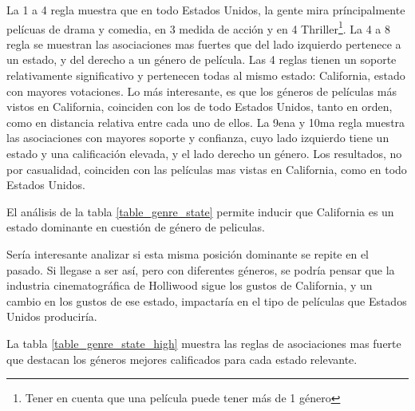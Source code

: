 \documentclass[journal]{IEEEtran}
\begin{document}
La 1 a 4 regla muestra que en todo Estados Unidos, 
la gente mira príncipalmente pelícuas de drama y comedia, 
en 3 medida de acción y en 4  Thriller\footnote{
Tener en cuenta que una película puede tener más de 1 género}. 
La 4 a 8 regla se muestran las asociaciones mas fuertes que del 
lado izquierdo pertenece a un estado, y del derecho a un género
de película. Las 4 reglas tienen un soporte relativamente significativo y
pertenecen todas al mismo estado: California, estado con mayores votaciones.
Lo más interesante, es que los géneros de películas más vistos en California,
coinciden con los de todo Estados Unidos, tanto en orden, como en distancia
relativa entre cada uno de ellos.
La 9ena y 10ma regla muestra las asociaciones con mayores soporte y confianza, cuyo
lado izquierdo tiene un estado y una calificación elevada, y el lado derecho
un género. Los resultados, no por casualidad, coinciden con las películas
mas vistas en California, como en todo Estados Unidos.

El análisis de la tabla \ref{table_genre_state} permite inducir que
California es un estado dominante en cuestión de género de peliculas. 

Sería interesante analizar si esta misma posición dominante se repite en el pasado.
Si llegase a ser así, pero con diferentes géneros, se podría pensar que la industria
cinematográfica de Holliwood sigue los gustos de California, y un cambio en los 
gustos de ese estado, impactaría en el tipo de películas que Estados Unidos produciría.

La tabla \ref{table_genre_state_high} muestra las reglas de asociaciones mas fuerte que
destacan los géneros mejores calificados para cada estado relevante.
\end{document}
